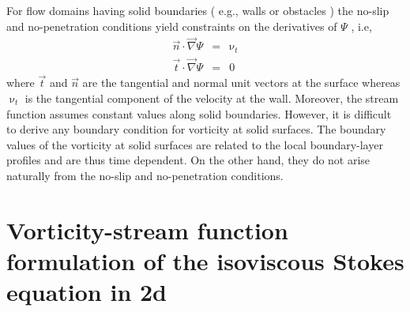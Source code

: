 For flow domains having solid boundaries ( e.g., walls or obstacles ) the
no-slip and no-penetration conditions yield constraints on the derivatives of $\Psi$ , i.e,
\begin{eqnarray}
\vec{n} \cdot \vec\nabla \Psi &=& \upnu_t \\
\vec{t} \cdot \vec\nabla \Psi &=& 0
\end{eqnarray}
where $\vec{t}$ and $\vec{n}$ are the tangential and normal unit vectors at the surface whereas 
$\upnu_t$ is the tangential component of the velocity at the wall. Moreover, the stream
function assumes constant values along solid boundaries. 
However, it is difficult to
derive any boundary condition for vorticity at solid surfaces. The boundary values
of the vorticity at solid surfaces are related to the local boundary-layer profiles
and are thus time dependent. On the other hand, they do not arise naturally
from the no-slip and no-penetration conditions. 





\section{Vorticity-stream function formulation of the isoviscous Stokes equation in 2d}

